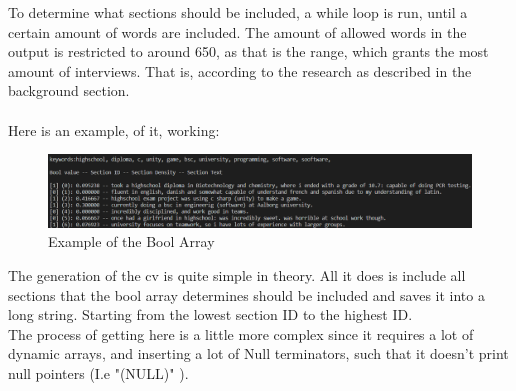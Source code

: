 To determine what sections should be included, a while loop is run, until a certain amount of words are included.
The amount of allowed words in the output is restricted to around 650, as that is the range, which grants the most amount of interviews.
That is, according to the research as described in the background section.
\\ \\
Here is an example, of it, working: 
\begin{figure}[H]
  \centering
  \includegraphics[scale = 0.6]{figures/bool_example.png}
  \caption{Example of the Bool Array}
\end{figure}
The generation of the cv is quite simple in theory. All it does is include all sections that the bool array determines should be included and saves it into a long string.
Starting from the lowest section ID to the highest ID. \\
The process of getting here is a little more complex since it requires a lot of dynamic arrays, and inserting a lot of Null terminators, such that it doesn't print null pointers (I.e "(NULL)" ).


